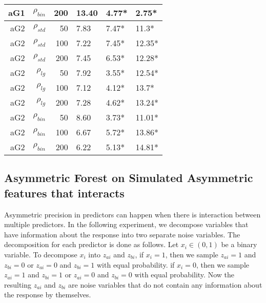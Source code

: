 \documentclass[twoside,11pt]{article}
\begin{document}
\begin{table}
\begin{tabular}{rrrp{2.5cm}p{2.5cm}p{2.5cm}}
aG1   & $\rho_{bin}$ & 200   & 13.40 & 4.77* & 2.75* \bigstrut[b]\\
\hline
aG2   & $\rho_{std}$ & 50    & 7.83  & 7.47* & 11.3* \bigstrut[t]\\
aG2   & $\rho_{std}$ & 100   & 7.22  & 7.45* & 12.35* \\
aG2   & $\rho_{std}$ & 200   & 7.45  & 6.53* & 12.28* \bigstrut[b]\\
\hline
aG2   & $\rho_{lg}$ & 50    & 7.92  & 3.55* & 12.54* \bigstrut[t]\\
aG2   & $\rho_{lg}$ & 100   & 7.12  & 4.12* & 13.7* \\
aG2   & $\rho_{lg}$ & 200   & 7.28  & 4.62* & 13.24* \bigstrut[b]\\
\hline
aG2   & $\rho_{bin}$ & 50    & 8.60  & 3.73* & 11.01* \bigstrut[t]\\
aG2   & $\rho_{bin}$ & 100   & 6.67  & 5.72* & 13.86* \\
aG2   & $\rho_{bin}$ & 200   & 6.22  & 5.13* & 14.81* \bigstrut[b]\\
\hline
\end{tabular}%
\label{tab:asymmetricfeaturesresults}%
\end{table}%


\subsection{Asymmetric Forest on Simulated Asymmetric features that interacts}
Asymmetric precision in predictors can happen when there is interaction between multiple predictors. In the following experiment, we decompose variables that have information about the response into two separate noise variables. The decomposition for each predictor is done as follows. Let $x_i \in (0,1)$ be a binary variable. To decompose $x_i$ into $z_{ai}$ and $z_{bi}$, if $x_i=1$, then we sample $z_{ai}=1$ and $z_{bi}=0$ or $z_{ai}=0$ and $z_{bi}=1$ with equal probability. if $x_i=0$, then we sample $z_{ai}=1$ and $z_{bi}=1$ or $z_{ai}=0$ and $z_{bi}=0$ with equal probability. Now the resulting $z_{ai}$ and $z_{bi}$ are noise variables that do not contain any information about the response by themselves.
\end{document}
